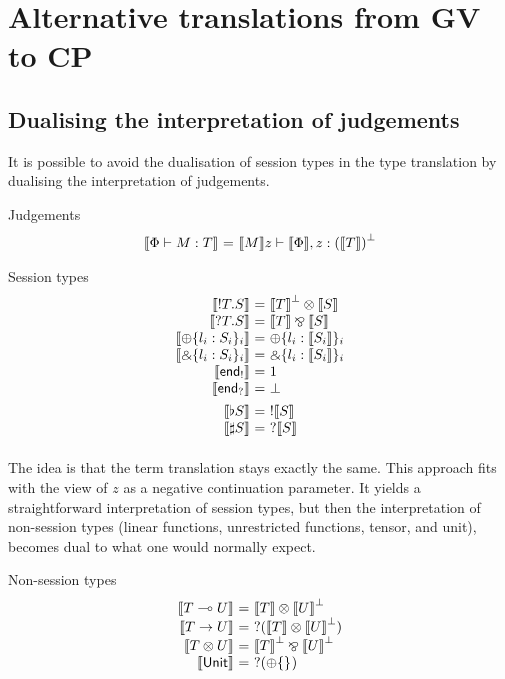 \documentclass{easychair}
\makeatletter
\newcommand{\ba}{\begin{array}}
\newcommand{\ea}{\end{array}}
\newenvironment{equations}{\[\ba{@{}r@{~}c@{~}l@{}}}{\ea\]}
\newcommand{\key}{\mathsf}
\newcommand{\set}[1]{\{ #1 \}}
\newcommand{\gvtocp}[1]{\llbracket{#1}\rrbracket}
\newcommand{\row}[2]{\set{#1}_{#2}}
\newcommand{\gvOutput}[2]{\mathord{!}{#1}.{#2}}
\newcommand{\gvInput}[2]{\mathord{?}{#1}.{#2}}
\newcommand{\gvEndOutput}{\key{end}_!}
\newcommand{\gvEndInput}{\key{end}_?}
\newcommand{\gvPlus}[2]{\oplus \row{#1}{#2}}
\newcommand{\gvChoice}[2]{\binampersand \row{#1}{#2}}
\newcommand{\gvServer}[1]{\flat {#1}}
\newcommand{\gvService}[1]{\sharp {#1}}
\newcommand{\cpj}[2]{{#1} \vdash {#2}}
\newcommand{\gvj}[3]{{#1} \vdash {#2} : {#3}}
\newcommand{\la}{l}
\newcommand{\lolli}{\multimap}
\newcommand{\gvLinFun}[2]{{#1} \lolli {#2}}
\newcommand{\gvUnFun}[2]{{#1} \to {#2}}
\newcommand{\gvTimes}[2]{{#1} \otimes {#2}}
\newcommand{\gvUnitType}{\key{Unit}}
\newcommand{\cpTimes}[2]{{#1} \otimes {#2}}
\newcommand{\cpPar}[2]{{#1} \mathbin{\bindnasrepma} {#2}}
\newcommand{\cpPlus}[2]{\oplus \row{#1}{#2}}
\newcommand{\cpWith}[2]{\binampersand \row{#1}{#2}}
\newcommand{\cpOne}{1}
\newcommand{\cpBottom}{\bot}
\newcommand{\cpOfCourse}[1]{!{#1}}
\newcommand{\cpWhyNot}[1]{?{#1}}
\newcommand{\cpDual}[1]{{#1}^\bot}
\newcommand{\gvtocps}[1]{\gvtocp{#1}}
\makeatother
\begin{document}
\section{Alternative translations from GV to CP}

\subsection{Dualising the interpretation of judgements}

It is possible to avoid the dualisation of session types in the type
translation by dualising the interpretation of judgements.

Judgements
\begin{equations}
\gvtocps{\gvj{\Phi}{M}{T}} &=& \cpj{\gvtocp{M} z}{\gvtocps{\Phi}, z:\cpDual{(\gvtocps{T})}}
\end{equations}

Session types
\begin{equations}
\gvtocps{\gvOutput{T}{S}}        &=& \cpTimes{\cpDual{\gvtocps{T}}}{\gvtocps{S}} \\
\gvtocps{\gvInput{T}{S}}         &=& \cpPar{\gvtocps{T}}{\gvtocps{S}} \\
\gvtocps{\gvPlus{\la_i:S_i}{i}}   &=& \cpPlus{\la_i:\gvtocps{S_i}}{i} \\
\gvtocps{\gvChoice{\la_i:S_i}{i}} &=& \cpWith{\la_i:\gvtocps{S_i}}{i} \\
\gvtocps{\gvEndOutput}              &=& \cpOne \\
\gvtocps{\gvEndInput}               &=& \cpBottom \\[1ex]

\gvtocps{\gvServer{S}}  &=& \cpOfCourse{\gvtocps{S}} \\
\gvtocps{\gvService{S}} &=& \cpWhyNot{\gvtocps{S}} \\[1ex]
\end{equations}


The idea is that the term translation stays exactly the same. This
approach fits with the view of $z$ as a negative continuation
parameter. It yields a straightforward interpretation of session
types, but then the interpretation of non-session types (linear
functions, unrestricted functions, tensor, and unit), becomes dual to
what one would normally expect.

Non-session types
\begin{equations}
\gvtocps{\gvLinFun{T}{U}} &=& \cpTimes{\gvtocp{T}}{\cpDual{\gvtocp{U}}} \\
\gvtocps{\gvUnFun{T}{U}} &=& \cpWhyNot{(\cpTimes{\gvtocp{T}}{\cpDual{\gvtocp{U}}})} \\
\gvtocps{\gvTimes{T}{U}} &=& \cpPar{\cpDual{\gvtocp{T}}}{\cpDual{\gvtocp{U}}} \\
\gvtocps{\gvUnitType} &=& \cpWhyNot{(\cpPlus{}{})} \\
\end{equations}
\end{document}
